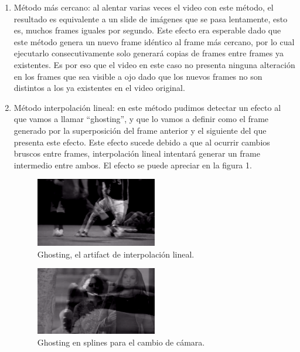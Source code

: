 \begin{enumerate}
\item M\'etodo m\'as cercano: al alentar varias veces el video con este m\'etodo, el resultado es equivalente a un slide de im\'agenes que se pasa lentamente, esto es, muchos frames iguales por segundo. Este efecto era esperable dado que este m\'etodo genera un nuevo frame id\'entico al frame m\'as cercano, por lo cual ejecutarlo consecutivamente solo generar\'a copias de frames entre frames ya existentes. Es por eso que el video en este caso no presenta ninguna alteraci\'on en los frames que sea visible a ojo dado que los nuevos frames no son distintos a los ya existentes en el video original.
\item M\'etodo interpolaci\'on lineal: en este m\'etodo pudimos detectar un efecto al que vamos a llamar ``ghosting'', y que lo vamos a definir como el frame generado por la superposici\'on del frame anterior y el siguiente del que presenta este efecto. Este efecto sucede debido a que al ocurrir cambios bruscos entre frames, interpolaci\'on lineal intentar\'a generar un frame intermedio entre ambos. El efecto se puede apreciar en la figura 1.

\begin{figure}[h!]
  \centering
    \includegraphics[width=0.5\textwidth]{img/artifact_lineal.png}
  	\caption{Ghosting, el artifact de interpolaci\'on lineal.}
\end{figure}

\begin{figure}[h!]
  \centering
    \includegraphics[width=0.5\textwidth]{img/ghosting_splines_1.png}
  	\caption{Ghosting en splines para el cambio de c\'amara.}
\end{figure}


\end{enumerate}
